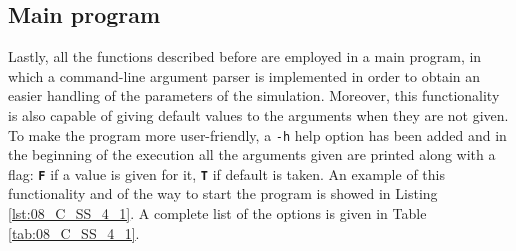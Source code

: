 \documentclass[pra, onecolumn, notitlepage, floats, 11pt]{revtex4-1}
\newcommand{\codebold}[2][cobalt]{\texttt{\bfseries {\color{#1}#2}}}
\newcommand{\code}[2][black]{\color{#1}\texttt{#2}}
\begin{document}
\subsection{Main program}
Lastly, all the functions described before are employed in a main program, in which a command-line argument parser is implemented in order to obtain an easier handling of the parameters of the simulation. Moreover, this functionality is also capable of giving default values to the arguments when they are not given.
To make the program more user-friendly, a \code{-h} help option has been added and in the beginning of the execution all the arguments given are printed along with a flag: \codebold[red]{F} if a value is given for it, \codebold[dartmouthgreen]{T} if default is taken. An example of this functionality and of the way to start the program is showed in Listing \ref{lst:08_C_SS_4_1}. A complete list of the options is given in Table \ref{tab:08_C_SS_4_1}.
\end{document}
